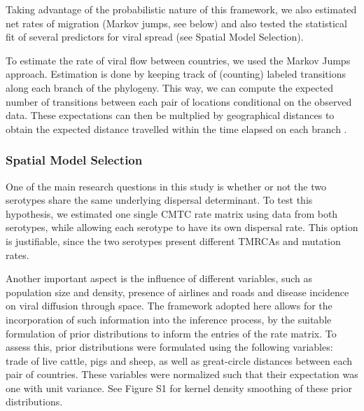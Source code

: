 \documentclass[10pt]{article}
\begin{document}
Taking advantage of the probabilistic nature of this framework, we also estimated net rates of migration (Markov jumps, see below) and also tested the statistical fit of several predictors for viral spread (see Spatial Model Selection).

To estimate the rate of viral flow between countries, we used the Markov Jumps \cite{Minin2008} approach. Estimation is done by keeping track of (counting) labeled transitions along each branch of the phylogeny. This way, we can compute the expected number of transitions between each pair of locations conditional on the observed data. These expectations can then be multplied by geographical distances to obtain the expected distance travelled within the time elapsed on each branch \cite{zoonotic}.


\subsubsection*{Spatial Model Selection}

One of the main research questions in this study is whether or not the two serotypes share the same underlying dispersal determinant. 
To test this hypothesis, we estimated one single CMTC rate matrix using data from both serotypes, while allowing each serotype to have its own dispersal rate. 
This option is justifiable, since the two serotypes present different TMRCAs and mutation rates. 

Another important aspect is the influence of different variables, such as population size and density, presence of airlines and roads and disease incidence on viral diffusion through space. 
The framework adopted here allows for the incorporation of such information into the inference process, by the suitable formulation of prior distributions to inform the entries of the rate matrix. 
To assess this, prior distributions were formulated using the following variables: trade of live cattle, pigs and sheep, as well as great-circle distances between each pair of countries. 
These variables were normalized such that their expectation was one with unit variance. See Figure S1 for kernel density smoothing of these prior distributions.
\end{document}
